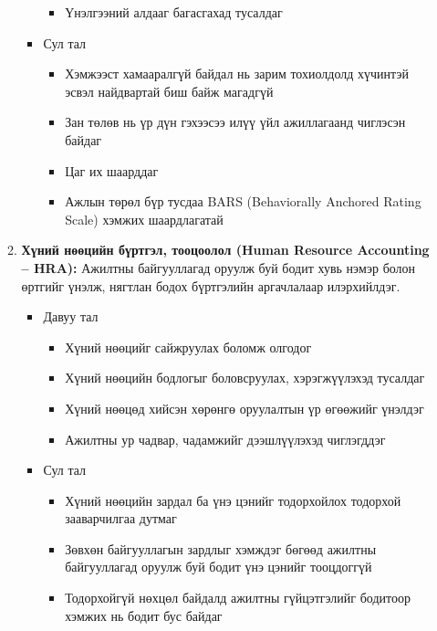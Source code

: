 \begin{enumerate}
\begin{enumerate}
\begin{itemize}
\begin{itemize}
                \item Үнэлгээний алдааг багасгахад тусалдаг
            \end{itemize}
            \item Сул тал
            \begin{itemize}
                \item Хэмжээст хамааралгүй байдал нь зарим тохиолдолд хүчинтэй эсвэл найдвартай биш байж магадгүй
                \item Зан төлөв нь үр дүн гэхээсээ илүү үйл ажиллагаанд чиглэсэн байдаг
                \item Цаг их шаарддаг
                \item Ажлын төрөл бүр тусдаа BARS (Behaviorally Anchored Rating Scale) хэмжих шаардлагатай
            \end{itemize}
        \end{itemize}
        \item \textbf{Хүний нөөцийн бүртгэл, тооцоолол (Human Resource Accounting – HRA):} Ажилтны 
        байгууллагад оруулж буй бодит хувь нэмэр болон өртгийг үнэлж, нягтлан бодох бүртгэлийн 
        аргачлалаар илэрхийлдэг.
        \begin{itemize}
            \item Давуу тал
            \begin{itemize}
                \item Хүний нөөцийг сайжруулах боломж олгодог
                \item Хүний нөөцийн бодлогыг боловсруулах, хэрэгжүүлэхэд тусалдаг
                \item Хүний нөөцөд хийсэн хөрөнгө оруулалтын үр өгөөжийг үнэлдэг
                \item Ажилтны ур чадвар, чадамжийг дээшлүүлэхэд чиглэгддэг
            \end{itemize}
            \item Сул тал
            \begin{itemize}
                \item Хүний нөөцийн зардал ба үнэ цэнийг тодорхойлох тодорхой зааварчилгаа дутмаг
                \item Зөвхөн байгууллагын зардлыг хэмждэг бөгөөд ажилтны байгууллагад оруулж буй бодит үнэ цэнийг тооцдоггүй
                \item Тодорхойгүй нөхцөл байдалд ажилтны гүйцэтгэлийг бодитоор хэмжих нь бодит бус байдаг
            \end{itemize}
        \end{itemize}

\end{enumerate}
\end{enumerate}
